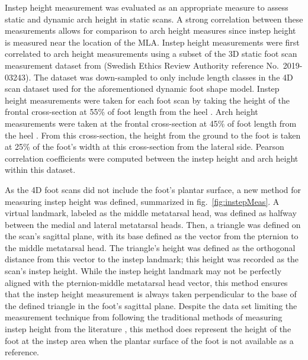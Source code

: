 \documentclass[defaultstyle,11pt]{comps}
\begin{document}
Instep height measurement was evaluated as an appropriate measure to assess static and dynamic arch height in static scans.
A strong correlation between these measurements allows for comparison to arch height measures since instep height is measured near the location of the MLA.
Instep height measurements were first correlated to arch height measurements using a subset of the 3D static foot scan measurement dataset from \citep{Jurca2019} (Swedish Ethics Review Authority reference No.~2019-03243).
The dataset was down-sampled to only include length classes in the 4D scan dataset used for the aforementioned dynamic foot shape model.
Instep height measurements were taken for each foot scan by taking the height of the frontal cross-section at 55\% of foot length from the heel \citep{Jurca2019}.
Arch height measurements were taken at the frontal cross-section at 45\% of foot length from the heel \citep{Jurca2019}.
From this cross-section, the height from the ground to the foot is taken at 25\% of the foot's width at this cross-section from the lateral side.
Pearson correlation coefficients were computed between the instep height and arch height within this dataset.

As the 4D foot scans did not include the foot's plantar surface, a new method for measuring instep height was defined, summarized in fig.~\ref{fig:instepMeas}.
A virtual landmark, labeled as the middle metatarsal head, was defined as halfway between the medial and lateral metatarsal heads.
Then, a triangle was defined on the scan's sagittal plane, with its base defined as the vector from the pternion to the middle metatarsal head.
The triangle's height was defined as the orthogonal distance from this vector to the instep landmark; this height was recorded as the scan's instep height.
While the instep height landmark may not be perfectly aligned with the pternion-middle metatarsal head vector, this method ensures that the instep height measurement is always taken perpendicular to the base of the defined triangle in the foot's sagittal plane.
Despite the data set limiting the measurement technique from following the traditional methods of measuring instep height from the literature \citep{Jurca2019}, this method does represent the height of the foot at the instep area when the plantar surface of the foot is not available as a reference.
\end{document}
